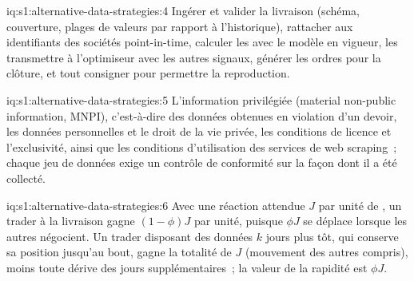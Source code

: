 \begin{solution}{iq:s1:alternative-data-strategies:4}
Ingérer et valider la livraison (schéma, couverture, plages de valeurs par rapport à l'historique), rattacher aux identifiants des sociétés point-in-time, calculer les  avec le modèle
en vigueur, les transmettre à l'optimiseur avec les autres signaux, générer les ordres pour la clôture, et tout consigner pour permettre la reproduction.
\end{solution}

\begin{solution}{iq:s1:alternative-data-strategies:5}
L'information privilégiée (material non-public information, MNPI), c'est-à-dire des données obtenues en violation d'un devoir, les données personnelles et le droit de la vie privée, les conditions de licence et l'exclusivité, ainsi que les conditions d'utilisation des
services de web scraping~; chaque jeu de données exige un contrôle de conformité sur la façon dont il a été collecté.
\end{solution}

\begin{solution}{iq:s1:alternative-data-strategies:6}
Avec une réaction attendue $J$ par unité de , un trader à la livraison gagne $(1 - \phi)J$ par unité, puisque $\phi J$ se déplace lorsque les autres négocient. Un trader disposant des
données $k$ jours plus tôt, qui conserve sa position jusqu'au bout, gagne la totalité de $J$ (mouvement des autres compris), moins toute dérive des jours supplémentaires~; la valeur de la rapidité est $\phi J$.
\end{solution}
